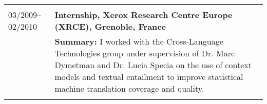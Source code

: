 \begin{tabular}{p{2.92cm}  p{13cm}}
	& \\
03/2009--02/2010	& \bf Internship, Xerox Research Centre Europe (XRCE), Grenoble, France \\
	& {\bf Summary:} I worked with the Cross-Language Technologies group under supervision of Dr. Marc Dymetman and Dr. Lucia Specia on the use of context models and textual entailment to improve statistical machine translation coverage and quality. \\ %
	& \\
\end{tabular}
